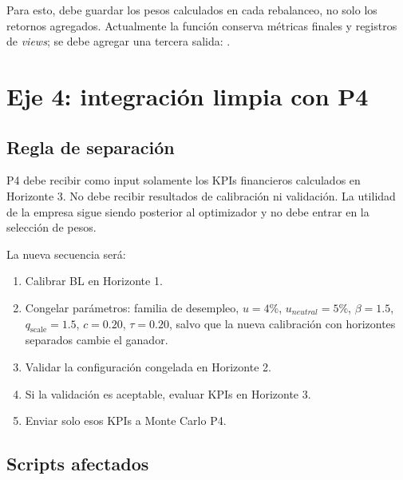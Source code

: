 \documentclass[11pt]{article}
\begin{document}
Para esto,  debe guardar los pesos calculados en cada rebalanceo, no solo los retornos agregados. Actualmente la funci\'on conserva m\'etricas finales y registros de \textit{views}; se debe agregar una tercera salida: .

\section{Eje 4: integraci\'on limpia con P4}

\subsection{Regla de separaci\'on}

P4 debe recibir como input solamente los KPIs financieros calculados en Horizonte 3. No debe recibir resultados de calibraci\'on ni validaci\'on. La utilidad de la empresa sigue siendo posterior al optimizador y no debe entrar en la selecci\'on de pesos.

La nueva secuencia ser\'a:

\begin{enumerate}[label=\arabic*.]
    \item Calibrar BL en Horizonte 1.
    \item Congelar par\'ametros: familia de desempleo, $u=4\%$, $u_{neutral}=5\%$, $\beta=1.5$, $q_{\text{scale}}=1.5$, $c=0.20$, $\tau=0.20$, salvo que la nueva calibraci\'on con horizontes separados cambie el ganador.
    \item Validar la configuraci\'on congelada en Horizonte 2.
    \item Si la validaci\'on es aceptable, evaluar KPIs en Horizonte 3.
    \item Enviar solo esos KPIs a Monte Carlo P4.
\end{enumerate}

\subsection{Scripts afectados}
\end{document}
